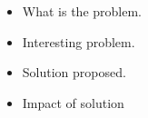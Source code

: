 \begin{itemize}
    \item What is the problem.
    \item Interesting problem.
    \item Solution proposed.
    \item Impact of solution
\end{itemize}